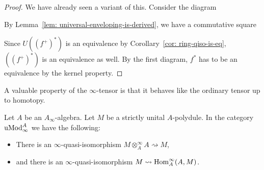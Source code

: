 \documentclass[../thesis.tex]{subfiles}
\begin{document}
            \begin{proof}
                We have already seen a variant of this. Consider the diagram
                \begin{center}
                \end{center}

                By Lemma~\ref{lem: universal-enveloping-is-derived}, we have a commutative square
                \begin{center}
                \end{center}

                Since $U((f^+)^*)$ is an equivalence by Corollary~\ref{cor: ring-qiso-is-eq}, $((f^+)^*)$ is an equivalence as well. By the first diagram, $f^*$ has to be an equivalence by the kernel property.
            \end{proof}

            A valuable property of the $\infty$-tensor is that it behaves like the ordinary tensor up to homotopy.

            \begin{lemma}\label{lem: tensor-hom-qiso}
                Let $A$ be an $A_\infty$-algebra. Let $M$ be a strictly unital $A$-polydule. In the category $\tt{uMod}_\infty^A$ we have the following:
                \begin{itemize}
                    \item There is an $\infty$-quasi-isomorphism $M \otimes_A^\infty A \rightsquigarrow M$,
                    \item and there is an $\infty$-quasi-isomorphism $M \rightsquigarrow \tt{Hom}_A^\infty(A,M)$.
                \end{itemize}
            \end{lemma}
\end{document}
